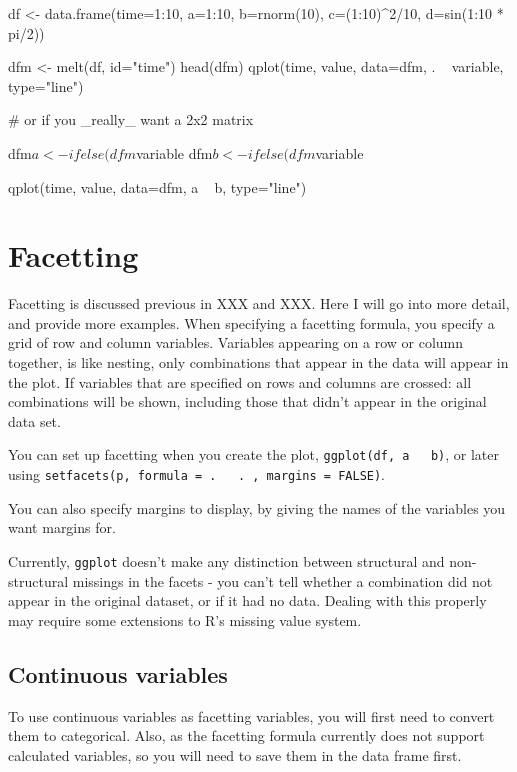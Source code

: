 df <- data.frame(time=1:10, a=1:10, b=rnorm(10), c=(1:10)^2/10, d=sin(1:10 * pi/2))

dfm <- melt(df, id="time")
head(dfm)
qplot(time, value, data=dfm, . ~ variable, type="line")

# or if you _really_ want a 2x2 matrix

dfm$a <- ifelse(dfm$variable %
dfm$b <- ifelse(dfm$variable %

qplot(time, value, data=dfm, a ~ b, type="line")

\section{Facetting}\label{sec:facetting}

Facetting is discussed previous in XXX and XXX.  Here I will go into more detail, and provide more examples.  When specifying a facetting formula, you specify a grid of row and column variables.  Variables appearing on a row or column together, is like nesting, only combinations that appear in the data will appear in the plot.  If variables that are specified on rows and columns are crossed: all combinations will be shown, including those that didn't appear in the original data set.  

You can set up facetting when you create the plot, {\tt ggplot(df, a ~ b)}, or later using \texttt{setfacets(p, formula = . ~ . , margins = FALSE)}.

You can also specify margins to display, by giving the names of the variables you want margins for.  


Currently, {\tt ggplot} doesn't make any distinction between structural and non-structural missings in the facets - you can't tell whether a combination did not appear in the original dataset, or if it had no data.  Dealing with this properly may require some extensions to R's missing value system.  

\subsection{Continuous variables}\label{sub:continuous_variables}

To use continuous variables as facetting variables, you will first need to convert them to categorical.  Also, as the facetting formula currently does not support calculated variables, so you will need to save them in the data frame first.

